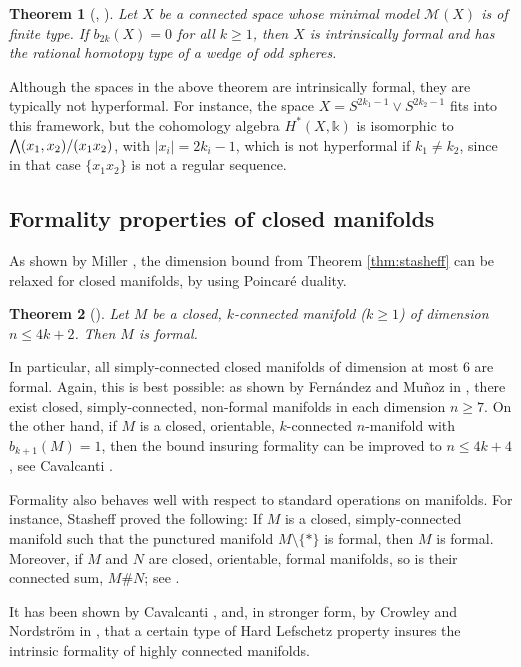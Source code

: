 \documentclass{article}
\numberwithin{equation}{section}
\newtheorem{theorem}{Theorem}[section]
\theoremstyle{definition}
\renewcommand{\k}{\mathbb{k}}
\newcommand{\M}{\mathcal{M}}
\newcommand{\abs}[1]{\left| #1 \right|}
\def\set#1{{\{ #1\}}}
\newcommand{\bwedge}{\mbox{\normalsize $\bigwedge$}}
\begin{document}
\begin{theorem}[\cite{Baues}, \cite{HS79}]
\label{thm:wedge-spheres}
Let $X$ be a connected space whose minimal model $\M(X)$ is of finite type. 
If $b_{2k}(X)=0$ for all $k\ge 1$, then $X$ is intrinsically formal and has 
the rational homotopy type of a wedge of odd spheres.
\end{theorem}

Although the spaces in the above theorem are intrinsically formal, they are 
typically not hyperformal. For instance, the space $X=S^{2k_1-1}\vee S^{2k_2-1}$ 
fits into this framework, but the cohomology algebra 
$H^*(X,\k)$ is isomorphic to $\bwedge (x_1,x_2)/(x_1x_2)$, 
with $\abs{x_i}=2k_i-1$, which is not hyperformal if $k_1\ne k_2$, 
since in that case $\{x_1x_2\}$ is not a regular sequence.

\subsection{Formality properties of closed manifolds}
\label{subsec:formal-mfd}

As shown by Miller \cite{Mi79}, the dimension bound from Theorem \ref{thm:stasheff}
can be relaxed for closed manifolds, by using Poincar\'{e} duality.  

\begin{theorem}[\cite{Mi79}]
\label{thm:miller}
Let $M$ be a closed, $k$-connected manifold ($k\ge 1$) 
of dimension $n \le 4k+2$. Then $M$ is formal.  
\end{theorem}

In particular, all simply-connected closed
manifolds of dimension at most $6$ are formal.  
Again, this is best possible: as shown by 
Fern\'andez and Mu\~noz in \cite{FM04}, there exist  
closed, simply-connected, non-formal manifolds in each  
dimension $n\ge 7$.  On the other hand, if $M$ is a closed, 
orientable, $k$-connected $n$-manifold with $b_{k+1}(M)=1$, 
then the bound insuring formality can be improved to $n \le 4k+4$, 
see Cavalcanti \cite{Ca}.  

Formality also behaves well with respect to standard operations 
on manifolds.  For instance, Stasheff \cite{Sta83} proved the 
following: If $M$ is a closed, simply-connected manifold such 
that the punctured manifold $M\setminus \set{*}$ is formal, 
then $M$ is formal.  Moreover, if $M$ and $N$ are closed, 
orientable, formal manifolds, so is their connected sum, $M\# N$;
see \cite{FHT}.

It has been shown by Cavalcanti \cite{Ca}, and, in stronger form, 
by Crowley and Nordstr\"{o}m in \cite{CN}, that a certain type of 
Hard Lefschetz property insures the intrinsic formality of highly 
connected manifolds. 
\end{document}
